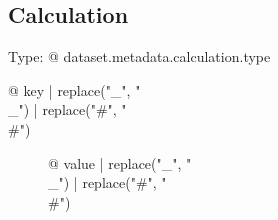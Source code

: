 \subsection{Calculation}

Type: {@ dataset.metadata.calculation.type }

\begin{description}
\item[{@ key | replace("_", "\\_") | replace("#", "\\#") }] {@ value | replace("_", "\\_") | replace("#", "\\#") }
\end{description}
